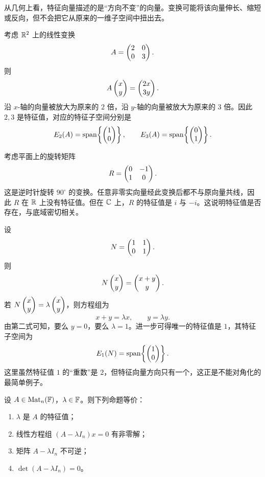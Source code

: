 从几何上看，特征向量描述的是“方向不变”的向量。变换可能将该向量伸长、缩短或反向，但不会把它从原来的一维子空间中扭出去。

\begin{example}
考虑 \(\mathbb{R}^2\) 上的线性变换
\[
A=\begin{pmatrix} 2&0\\0&3 \end{pmatrix}.
\]
则
\[
A\begin{pmatrix} x\\y \end{pmatrix}=\begin{pmatrix} 2x\\3y \end{pmatrix}.
\]
沿 \(x\)-轴的向量被放大为原来的 \(2\) 倍，沿 \(y\)-轴的向量被放大为原来的 \(3\) 倍。因此 \(2,3\) 是特征值，对应的特征子空间分别是
\[
E_2(A)=\operatorname{span}\!\left\{\begin{pmatrix} 1\\0 \end{pmatrix}\right\},\qquad E_3(A)=\operatorname{span}\!\left\{\begin{pmatrix} 0\\1 \end{pmatrix}\right\}.
\]
\end{example}

\begin{example}
考虑平面上的旋转矩阵
\[
R=\begin{pmatrix} 0&-1\\1&0 \end{pmatrix}.
\]
这是逆时针旋转 \(90^\circ\) 的变换。任意非零实向量经此变换后都不与原向量共线，因此 \(R\) 在 \(\mathbb{R}\) 上没有特征值。但在 \(\mathbb{C}\) 上，\(R\) 的特征值是 \(i\) 与 \(-i\)。这说明特征值是否存在，与底域密切相关。
\end{example}

\begin{example}
设
\[
N=\begin{pmatrix} 1&1\\0&1 \end{pmatrix}.
\]
则
\[
N\begin{pmatrix} x\\y \end{pmatrix}=\begin{pmatrix} x+y\\y \end{pmatrix}.
\]
若 \(N\begin{pmatrix} x\\y \end{pmatrix}=\lambda\begin{pmatrix} x\\y \end{pmatrix}\)，则方程组为
\[
x+y=\lambda x,\qquad y=\lambda y.
\]
由第二式可知，要么 \(y=0\)，要么 \(\lambda=1\)。进一步可得唯一的特征值是 \(1\)，其特征子空间为
\[
E_1(N)=\operatorname{span}\!\left\{\begin{pmatrix} 1\\0 \end{pmatrix}\right\}.
\]
这里虽然特征值 \(1\) 的“重数”是 \(2\)，但特征向量方向只有一个，这正是不能对角化的最简单例子。
\end{example}

\begin{proposition}\label{prop:eigenvalue-det-criterion}
设 \(A\in \mathrm{Mat}_n(\mathbb{F})\)，\(\lambda\in \mathbb{F}\)。则下列命题等价：
\begin{enumerate}[label=(\arabic*), leftmargin=2.4em]
  \item \(\lambda\) 是 \(A\) 的特征值；
  \item 线性方程组 \((A-\lambda I_n)x=0\) 有非零解；
  \item 矩阵 \(A-\lambda I_n\) 不可逆；
  \item \(\det(A-\lambda I_n)=0\)。
\end{enumerate}
\end{proposition}

